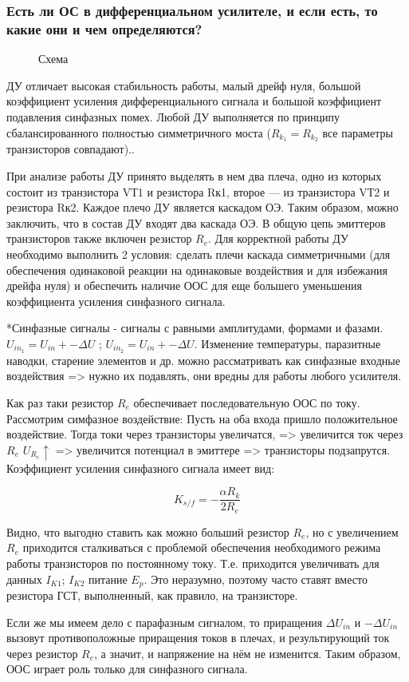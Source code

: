 \subsubsection{Есть ли ОС в дифференциальном усилителе, и если есть, то какие они и чем определяются?}

\begin{center}
	\begin{figure}[h!]
		\caption{Схема}
	\end{figure}
\end{center} 
ДУ отличает высокая стабильность работы, малый дрейф нуля, большой коэффициент усиления дифференциального сигнала и большой коэффициент подавления синфазных помех.
Любой ДУ выполняется по принципу сбалансированного полностью симметричного моста ($R_{k_1} = R_{k_2}$ все параметры транзисторов совпадают).. 

При анализе работы ДУ принято выделять в нем два плеча, одно из которых состоит из транзистора VТ1 и резистора Rк1, второе  — из транзистора VТ2 и резистора Rк2. Каждое плечо ДУ является каскадом ОЭ. Таким образом, можно заключить, что в состав ДУ входят два каскада ОЭ. В общую цепь эмиттеров транзисторов также включен резистор $R_e$. Для корректной работы ДУ необходимо выполнить 2 условия: сделать плечи каскада симметричными (для обеспечения одинаковой реакции на одинаковые воздействия и для избежания дрейфа нуля) и обеспечить наличие ООС для еще большего уменьшения коэффициента усиления синфазного сигнала.

*Синфазные сигналы  - сигналы с равными амплитудами, формами и фазами. $U_{in_1} = U_{in} +- \Delta U$ ; $U_{in_2} = U_{in} +- \Delta U$. Изменение температуры, паразитные наводки, старение элементов и др. можно рассматривать как синфазные входные воздействия => нужно их подавлять, они вредны для работы любого усилителя.

Как раз таки резистор $R_e$ обеспечивает последовательную ООС по току. Рассмотрим симфазное воздействие: Пусть на оба входа пришло положительное воздействие. Тогда токи через транзисторы увеличатся, => увеличится ток через $R_e$ \Rightarrow $U_{R_e} \uparrow$ => увеличится потенциал в эмиттере => транзисторы подзапрутся. Коэффициент усиления синфазного сигнала имеет вид:

$$
K_{s/f} = -\frac{\alpha R_k}{2R_e}
$$

Видно, что выгодно ставить как можно больший резистор $R_e$, но с увеличением $R_e$ приходится сталкиваться с проблемой обеспечения необходимого режима работы транзисторов по постоянному току. Т.е. приходится увеличивать для данных $I_{K1}$; $I_{K2}$ питание $E_p$. Это неразумно, поэтому часто ставят вместо резистора ГСТ, выполненный, как правило, на транзисторе.

Если же мы имеем дело с парафазным сигналом, то приращения $\Delta U_{in}$ и $-\Delta U_{in}$ вызовут противоположные приращения токов в плечах, и результирующий ток через резистор $R_e$, а значит, и напряжение на нём не изменится. Таким образом, ООС играет роль только для синфазного сигнала. 
